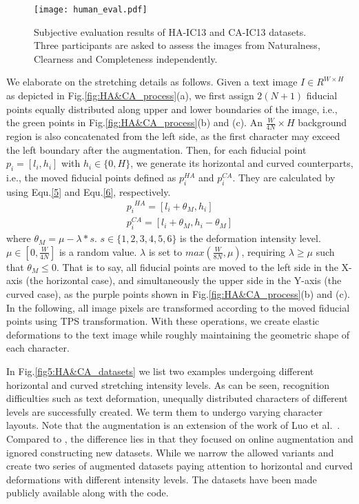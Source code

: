 \begin{figure*}[]
\centering
\texttt{[image: human\_eval.pdf]} \caption{Subjective evaluation results of HA-IC13 and CA-IC13 datasets. Three participants are asked to assess the images from Naturalness, Clearness and Completeness independently.}
\label{human_eval}
\end{figure*}

We elaborate on the stretching details as follows. Given a text image $I\in{R}^{W \times H}$ as depicted in Fig.\ref{fig:HA&CA_process}(a), we first assign $2(N+1)$ fiducial points equally distributed along upper and lower boundaries of the image, i.e., the green points in Fig.\ref{fig:HA&CA_process}(b) and (c). An ${\frac{W}{4N} \times H}$ background region is also concatenated from the left side, as the first character may exceed the left boundary after the augmentation. Then, for each fiducial point $p_{i}=\left[l_{i}, h_{i}\right]$ with $h_{i}\in\{0, H\}$, we generate its horizontal and curved counterparts, i.e., the moved fiducial points defined as $p_{i}^{HA}$ and $p_{i}^{CA}$. They are calculated by using Equ.\ref{5} and Equ.\ref{6}, respectively.
\begin{gather}
p_{i}{ }^{H A}=\left[l_{i}+\theta_{M}, h_{i}\right] \label{5}\\
p_{i}^{C A}=\left[l_{i}+\theta_{M}, h_{i}-\theta_{M}\right] \label{6}
\end{gather}
where $\theta_{M}=\mu-\lambda*s$. $s\in \{1, 2, 3, 4, 5, 6\}$ is the deformation intensity level. $\mu \in \left[0, \frac{W}{4N}\right]$ is a random value. $\lambda$ is set to $max(\frac{W}{8N}, \mu)$, requiring $\lambda \geq \mu$ such that $\theta_{M}\leq 0$. That is to say, all fiducial points are moved to the left side in the X-axis (the horizontal case), and simultaneously the upper side in the Y-axis (the curved case), as the purple points shown in Fig.\ref{fig:HA&CA_process}(b) and (c). In the following, all image pixels are transformed according to the moved fiducial points using TPS transformation. With these operations, we create elastic deformations to the text image while roughly maintaining the geometric shape of each character.

In Fig.\ref{fig5:HA&CA_datasets} we list two examples undergoing different horizontal and curved stretching intensity levels. As can be seen, recognition difficulties such as text deformation, unequally distributed characters of different levels are successfully created. We term them to undergo varying character layouts. Note that the augmentation is an extension of the work of Luo et al.~\citep{luo2020learn_to_aug}. Compared to \citep{luo2020learn_to_aug}, the difference lies in that they focused on online augmentation and ignored constructing new datasets. While we narrow the allowed variants and create two series of augmented datasets paying attention to horizontal and curved deformations with different intensity levels. The datasets have been made publicly available along with the code.

